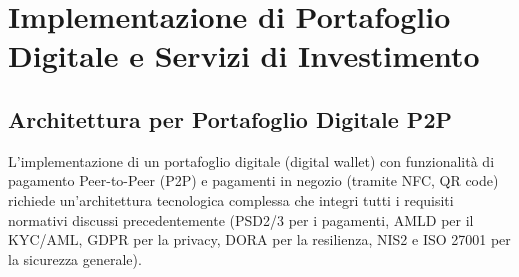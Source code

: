 \section{Implementazione di Portafoglio Digitale e Servizi di Investimento}
\label{sec:digital_wallet_investment}

\subsection{Architettura per Portafoglio Digitale P2P}
L'implementazione di un portafoglio digitale (digital wallet) con funzionalità di pagamento Peer-to-Peer (P2P) e pagamenti in negozio (tramite NFC, QR code) richiede un'architettura tecnologica complessa che integri tutti i requisiti normativi discussi precedentemente (PSD2/3 per i pagamenti, AMLD per il KYC/AML, GDPR per la privacy, DORA per la resilienza, NIS2 e ISO 27001 per la sicurezza generale).


